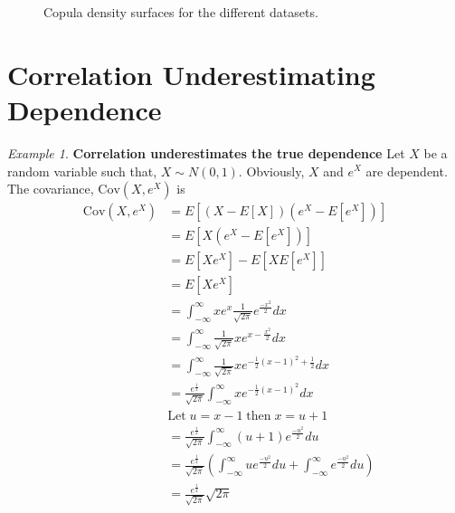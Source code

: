 \documentclass[%
a4paper,							
11pt,								
bibliography=totoc,						
abstracton=true					
]
{scrartcl}
\theoremstyle{plain}
\theoremstyle{definition}
\theoremstyle{remark}
\newtheorem{example}[theorem]{Example}
\newcommand{\1}{\mathbbm{1}}
\begin{document}
\begin{figure}[H]
\begin{minipage}{0.45\textwidth}
    \end{minipage}
    \caption{Copula density surfaces for the different datasets.}
    \label{fig:NeuralCopulaGradient}
\end{figure}

\newpage
\section{Correlation Underestimating Dependence }\label{sec:CorrelationUnderestimates}
\begin{example} 
    \textbf{Correlation underestimates the true dependence} 
    Let $X$ be a random variable such that, $X \sim N(0,1)$. Obviously, $X$ and $e^X$ are dependent. The covariance, $\mathrm{Cov}(X,e^X)$ is
    \begin{align*}
        \mathrm{Cov}(X,e^X) &= E \left[  (X-E\left[  X \right])(e^X-E\left[  e^X \right])  \right]\\
         &=  E \left[  X(e^X-E\left[  e^X \right]) \right]\\
         &= E \left[  Xe^X  \right] - E \left[  X E \left[  e^X \right] \right]\\
         &= E \left[  Xe^X  \right]\\
         &= \int_{-\infty}^\infty xe^x \frac{1}{\sqrt{2\pi}} e^{\frac{-x^2}{2}} dx\\ %
         &=  \int_{-\infty}^\infty \frac{1}{\sqrt{2\pi}} x  e^{x -\frac{x^2}{2}} dx \\
         &= \int_{-\infty}^\infty \frac{1}{\sqrt{2\pi}} x  e^{-\frac{1}{2}(x-1)^2+\frac{1}{2} } dx \\
         &= \frac{e^\frac{1}{2}}{\sqrt{2\pi}}\int_{-\infty}^\infty x  e^{-\frac{1}{2}(x-1)^2 } dx\\
         & \mathrm{Let\;} u = x-1 \; \mathrm{then\;} x = u+1\\
         &= \frac{e^\frac{1}{2}}{\sqrt{2\pi}}\int_{-\infty}^\infty (u+1)e^{\frac{-u^2}{2}} du\\
         &= \frac{e^\frac{1}{2}}{\sqrt{2\pi}} \left( \int_{-\infty}^\infty ue^{\frac{-u^2}{2}}du +\int_{-\infty}^\infty e^{\frac{-u^2}{2}} du  \right) \\
         &= \frac{e^\frac{1}{2}}{\sqrt{2\pi}}\sqrt{2\pi}   \\

\end{align*}
\end{example}
\end{document}
